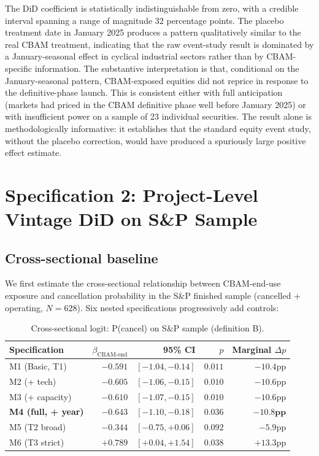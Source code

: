 \documentclass[11pt,a4paper]{article}
\begin{document}
The DiD coefficient is statistically indistinguishable from zero, with a credible interval spanning a range of magnitude $32$ percentage points. The placebo treatment date in January 2025 produces a pattern qualitatively similar to the real CBAM treatment, indicating that the raw event-study result is dominated by a January-seasonal effect in cyclical industrial sectors rather than by CBAM-specific information. The substantive interpretation is that, conditional on the January-seasonal pattern, CBAM-exposed equities did not reprice in response to the definitive-phase launch. This is consistent either with full anticipation (markets had priced in the CBAM definitive phase well before January 2025) or with insufficient power on a sample of 23 individual securities. The result alone is methodologically informative: it establishes that the standard equity event study, without the placebo correction, would have produced a spuriously large positive effect estimate.

\section{Specification 2: Project-Level Vintage DiD on S\&P Sample}
\label{sec:ch8-projectdid}

\subsection{Cross-sectional baseline}

We first estimate the cross-sectional relationship between CBAM-end-use exposure and cancellation probability in the S\&P finished sample (cancelled + operating, $N = 628$). Six nested specifications progressively add controls:

\begin{table}[ht]
\centering
\caption{Cross-sectional logit: P(cancel) on S\&P sample (definition B).}
\label{tab:ch8-cross-sectional}
\begin{tabular}{lrrrr}
\toprule
Specification & $\beta_{\text{CBAM-end}}$ & 95\% CI & $p$ & Marginal $\Delta p$ \\
\midrule
M1 (Basic, T1)           & $-0.591$ & $[-1.04, -0.14]$ & $0.011$ & $-10.4$pp \\
M2 (+ tech)              & $-0.605$ & $[-1.06, -0.15]$ & $0.010$ & $-10.6$pp \\
M3 (+ capacity)          & $-0.610$ & $[-1.07, -0.15]$ & $0.010$ & $-10.6$pp \\
\textbf{M4 (full, + year)} & $\mathbf{-0.643}$ & $[\mathbf{-1.10, -0.18}]$ & $\mathbf{0.036}$ & $\mathbf{-10.8\text{pp}}$ \\
M5 (T2 broad)            & $-0.344$ & $[-0.75, +0.06]$ & $0.092$ & $-5.9$pp \\
M6 (T3 strict)           & $+0.789$ & $[+0.04, +1.54]$ & $0.038$ & $+13.3$pp \\
\bottomrule
\end{tabular}
\end{table}
\end{document}
